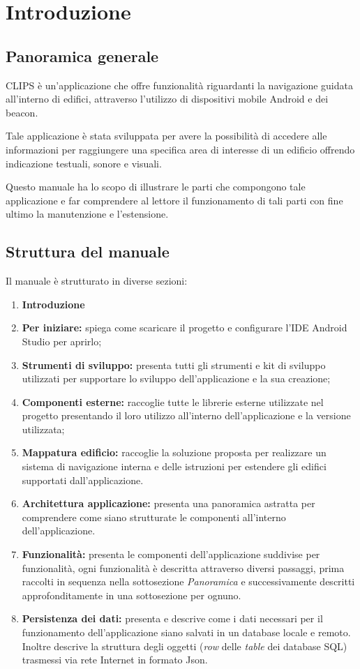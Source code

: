 \documentclass[../ManualeSviluppatore.tex]{subfiles}
\begin{document}
\section{Introduzione}
\label{sec:Introduzione}
	\subsection{Panoramica generale}
	
	CLIPS è un'applicazione che offre funzionalità riguardanti la navigazione guidata all'interno di edifici, attraverso l'utilizzo di dispositivi mobile \gls{Android} e dei \gls{beacon}.
	
	Tale applicazione è stata sviluppata per avere la possibilità di accedere alle informazioni per raggiungere una specifica area di interesse di un edificio offrendo indicazione testuali, sonore e visuali.
	
	Questo manuale ha lo scopo di illustrare le parti che compongono tale applicazione e far comprendere al lettore il funzionamento di tali parti con fine ultimo la manutenzione e l'estensione.
	
	\subsection{Struttura del manuale}
		Il manuale è strutturato in diverse sezioni:
		\begin{enumerate}
			\item \textbf{Introduzione}
			\item \textbf{Per iniziare:} spiega come scaricare il progetto e configurare l'IDE \gls{Android Studio} per aprirlo;
			\item \textbf{Strumenti di sviluppo:} presenta tutti gli strumenti e kit di sviluppo utilizzati per supportare lo sviluppo dell'applicazione e la sua creazione;
			\item \textbf{Componenti esterne:} raccoglie tutte le librerie esterne utilizzate nel progetto presentando il loro utilizzo all'interno dell'applicazione e la versione utilizzata;
			\item \textbf{Mappatura edificio:} raccoglie la soluzione proposta per realizzare un sistema di navigazione interna e delle istruzioni per estendere gli edifici supportati dall'applicazione.
			\item \textbf{Architettura applicazione:} presenta una panoramica astratta per comprendere come siano strutturate le componenti all'interno dell'applicazione.
			\item \textbf{Funzionalità:} presenta le componenti dell'applicazione suddivise per funzionalità, ogni funzionalità è descritta attraverso diversi passaggi, prima raccolti in sequenza nella sottosezione \textit{Panoramica} e successivamente descritti approfonditamente in una sottosezione per ognuno.
			\item \textbf{Persistenza dei dati:} presenta e descrive come i dati necessari per il funzionamento dell'applicazione siano salvati in un database locale e remoto. Inoltre descrive la struttura degli oggetti (\textit{row} delle \textit{table} dei database SQL) trasmessi via rete Internet in formato Json.
			
		\end{enumerate}
		
\end{document}
